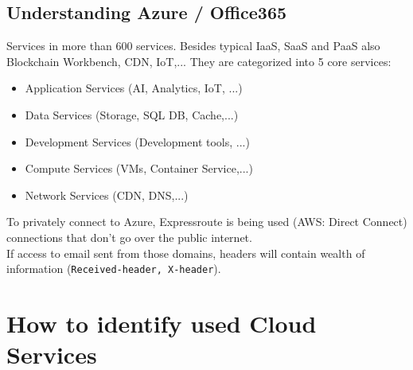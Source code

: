 \documentclass[12pt]{article}
\begin{document}
\subsection*{Understanding Azure / Office365}
Services in more than 600 services. Besides typical IaaS, SaaS and PaaS also Blockchain Workbench, CDN, IoT,... They are categorized into 5 core services:
\begin{itemize}
    \item Application Services (AI, Analytics, IoT, ...)
    \item Data Services (Storage, SQL DB, Cache,...)
    \item Development Services (Development tools, ...)
    \item Compute Services (VMs, Container Service,...)
    \item Network Services (CDN, DNS,...)
\end{itemize}
To privately connect to Azure, Expressroute is being used (AWS: Direct Connect) connections that don't go over the public internet. \\ 
If access to email sent from those domains, headers will contain wealth of information (\verb|Received-header, X-header|). 



\newpage
\section*{How to identify used Cloud Services}
\end{document}
